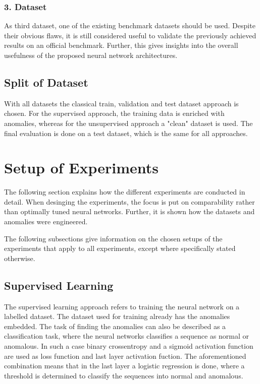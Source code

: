 \subsubsection{3. Dataset}
As third dataset, one of the existing benchmark datasets should be used. Despite their obvious flaws, it is still considered useful to validate the previously achieved results on an official benchmark. Further, this gives insights into the overall usefulness of the proposed neural network architectures.

\subsection{Split of Dataset}
With all datasets the classical train, validation and test dataset approach is chosen. For the supervised approach, the training data is enriched with anomalies, whereas for the unsupervised approach a "clean" dataset is used. The final evaluation is done on a test dataset, which is the same for all approaches.


\section{Setup of Experiments}
The following section explains how the different experiments are conducted in detail. When desinging the experiments, the focus is put on comparability rather than optimally tuned neural networks.  Further, it is shown how the datasets and anomalies were engineered.

The following subsections give information on the chosen setups of the experiments that apply to all experiments, except where specifically stated otherwise.

\subsection{Supervised Learning}
The supervised learning approach refers to training the neural network on a labelled dataset. The dataset used for training already has the anomalies embedded. The task of finding the anomalies can also be described as a classification task, where the neural networks classifies a sequence as normal or anomalous. In such a case binary crossentropy and a sigmoid activation function are used as loss function and last layer activation fuction. The aforementioned combination means that in the last layer a logistic regression is done, where a threshold is determined to classify the sequences into normal and anomalous.

